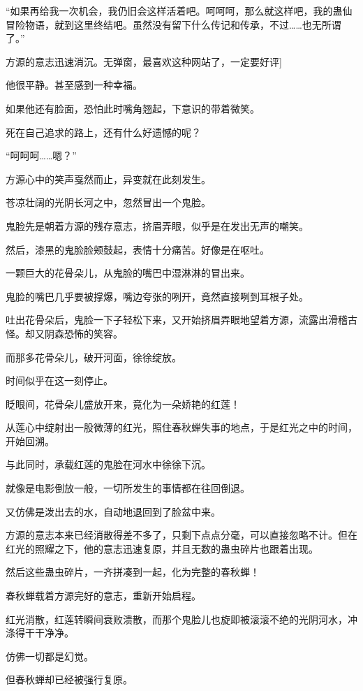 \begin{this_body}
“如果再给我一次机会，我仍旧会这样活着吧。呵呵呵，那么就这样吧，我的蛊仙冒险物语，就到这里终结吧。虽然没有留下什么传记和传承，不过……也无所谓了。”

方源的意志迅速消沉。无弹窗，最喜欢这种网站了，一定要好评]

他很平静。甚至感到一种幸福。

如果他还有脸面，恐怕此时嘴角翘起，下意识的带着微笑。

死在自己追求的路上，还有什么好遗憾的呢？

“呵呵呵……嗯？”

方源心中的笑声戛然而止，异变就在此刻发生。

苍凉壮阔的光阴长河之中，忽然冒出一个鬼脸。

鬼脸先是朝着方源的残存意志，挤眉弄眼，似乎是在发出无声的嘲笑。

然后，漆黑的鬼脸脸颊鼓起，表情十分痛苦。好像是在呕吐。

一颗巨大的花骨朵儿，从鬼脸的嘴巴中湿淋淋的冒出来。

鬼脸的嘴巴几乎要被撑爆，嘴边夸张的咧开，竟然直接咧到耳根子处。

吐出花骨朵后，鬼脸一下子轻松下来，又开始挤眉弄眼地望着方源，流露出滑稽古怪。却又阴森恐怖的笑容。

而那多花骨朵儿，破开河面，徐徐绽放。

时间似乎在这一刻停止。

眨眼间，花骨朵儿盛放开来，竟化为一朵娇艳的红莲！

从莲心中绽射出一股微薄的红光，照住春秋蝉失事的地点，于是红光之中的时间，开始回溯。

与此同时，承载红莲的鬼脸在河水中徐徐下沉。

就像是电影倒放一般，一切所发生的事情都在往回倒退。

又仿佛是泼出去的水，自动地退回到了脸盆中来。

方源的意志本来已经消散得差不多了，只剩下点点分毫，可以直接忽略不计。但在红光的照耀之下，他的意志迅速复原，并且无数的蛊虫碎片也跟着出现。

然后这些蛊虫碎片，一齐拼凑到一起，化为完整的春秋蝉！

春秋蝉载着方源完好的意志，重新开始启程。

红光消散，红莲转瞬间衰败溃散，而那个鬼脸儿也旋即被滚滚不绝的光阴河水，冲涤得干干净净。

仿佛一切都是幻觉。

但春秋蝉却已经被强行复原。


\end{this_body}
